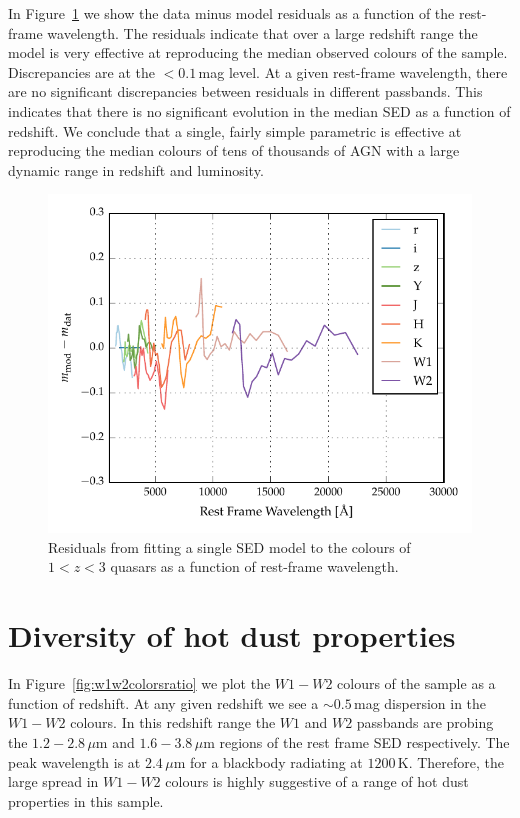 In Figure~\ref{fig:residuals} we show the data minus model residuals as a function of the rest-frame wavelength. 
The residuals indicate that over a large redshift range the model is very effective at reproducing the median observed colours of the sample. 
Discrepancies are at the $<0.1$\,mag level. 
At a given rest-frame wavelength, there are no significant discrepancies between residuals in different passbands. 
This indicates that there is no significant evolution in the median SED as a function of redshift. 
We conclude that a single, fairly simple parametric is effective at reproducing the median colours of tens of thousands of AGN with a large dynamic range in redshift and luminosity.

\begin{figure}[t!]
  \centering
  \includegraphics[width=\textwidth]{figures/chapter05/model_residuals.pdf}
  \caption[{Residuals from fit as a function of rest-frame wavelength.}]{Residuals from fitting a single SED model to the colours of $1 < z < 3$ quasars as a function of rest-frame wavelength.}
  \label{fig:residuals}
\end{figure}

\section{Diversity of hot dust properties}
\label{sec:ch5-hotdust}

In Figure~\ref{fig:w1w2colorsratio} we plot the $W1 - W2$ colours of the sample as a function of redshift. 
At any given redshift we see a $\sim 0.5$\,mag dispersion in the $W1-W2$ colours. 
In this redshift range the $W1$ and $W2$ passbands are probing the $1.2 - 2.8$\,$\mu$m and $1.6 - 3.8$\,$\mu$m regions of the rest frame SED respectively. 
The peak wavelength is at $2.4$\,$\mu$m for a blackbody radiating at $1200$\,K.
Therefore, the large spread in $W1-W2$ colours is highly suggestive of a range of hot dust properties in this sample. 

